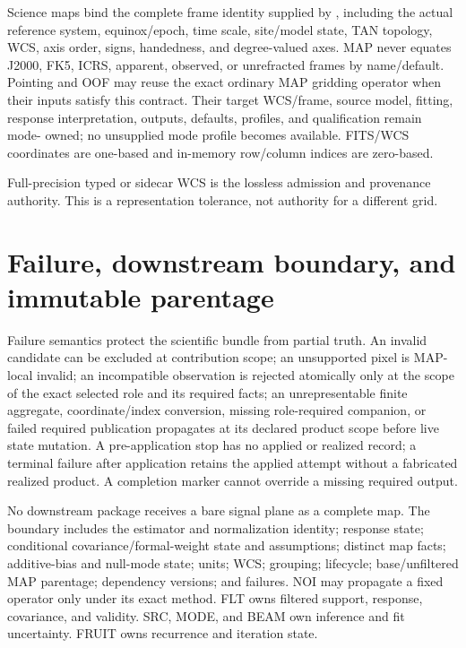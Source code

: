 \documentclass[10pt]{article}
\begin{document}
Science maps bind the complete frame identity supplied by
\SCIMapASTRTCGridProfile, including the actual reference
system, equinox/epoch, time scale, site/model state, TAN topology, WCS, axis
order, signs, handedness, and degree-valued axes. MAP never equates J2000,
FK5, ICRS, apparent, observed, or unrefracted frames by name/default. Pointing
and OOF may reuse the exact ordinary MAP gridding operator when their inputs
satisfy this contract. Their target WCS/frame, source model, fitting, response
interpretation, outputs, defaults, profiles, and qualification remain mode-
owned; no unsupplied mode profile becomes available. FITS/WCS coordinates are
one-based and in-memory row/column indices are zero-based.

Full-precision typed or sidecar WCS is the lossless admission and provenance
authority. \SCIMapWCSComparisonDefinition{} This is a representation tolerance,
not authority for a different grid.

\SCIMapLifecycleDefinition

\SCIMapLifecycleTable

\SCIMapAxisSeparationDefinition

\SCIMapLifecycleAssumption

\clearpage
\section{Failure, downstream boundary, and immutable parentage}

Failure semantics protect the scientific bundle from partial truth. An
invalid candidate can be excluded at contribution scope; an unsupported pixel
is MAP-local invalid; an incompatible observation is rejected atomically only
at the scope of the exact selected role and its required facts; an
unrepresentable finite aggregate, coordinate/index conversion, missing
role-required companion, or failed required publication propagates at its
declared product scope before live state mutation. A pre-application stop has
no applied or realized record; a terminal failure after application retains
the applied attempt without a fabricated realized product. A completion marker
cannot override a missing required output.

No downstream package receives a bare signal plane as a complete map. The
boundary includes the estimator and normalization identity; response state;
conditional covariance/formal-weight state and assumptions; distinct map facts;
additive-bias and null-mode state; units; WCS; grouping; lifecycle;
base/unfiltered MAP parentage; dependency versions; and failures.
\SCIMapNOIOwnershipStatement{} NOI may propagate a fixed
operator only under its exact method. FLT
owns filtered support, response, covariance, and validity. SRC, MODE, and BEAM
own inference and fit uncertainty. FRUIT owns recurrence and iteration state.
\end{document}
